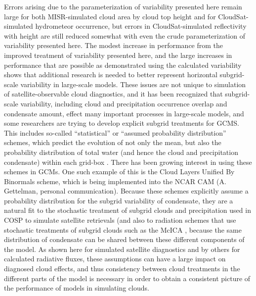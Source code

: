 Errors arising due to the parameterization of variability presented here remain large for both MISR-simulated cloud area by cloud top height and for CloudSat-simulated hydrometeor occurrence, but errors in CloudSat-simulated reflectivity with height are still reduced somewhat with even the crude parameterization of variability presented here. The modest increase in performance from the improved treatment of variability presented here, and the large increases in performance that are possible as demonstrated using the calculated variability shows that additional research is needed to better represent horizontal subgrid-scale variability in large-scale models. These issues are not unique to simulation of satellite-observable cloud diagnostics, and it has been recognized that subgrid-scale variability, including cloud and precipitation occurrence overlap and condensate amount, effect many important processes in large-scale models, and some researchers are trying to develop explicit subgrid treatments for GCMS. This includes so-called ``statistical'' or ``assumed probability distribution'' schemes, which predict the evolution of not only the mean, but also the probability distribution of total water (and hence the cloud and precipitation condensate) within each grid-box \citep[e.g.,][]{tompkins_2002}. There has been growing interest in using these schemes in GCMs. One such example of this is the Cloud Layers Unified By Binormals \citep[CLUBB;][]{golaz_et_al_2002} scheme, which is being implemented into the NCAR CAM (A. Gettelman, personal communication). Because these schemes explicitly assume a probability distribution for the subgrid variability of condensate, they are a natural fit to the stochastic treatment of subgrid clouds and precipitation used in COSP to simulate satellite retrievals (and also to radiation schemes that use stochastic treatments of subgrid clouds such as the McICA \citep{pincus_et_al_2003}, because the same distribution of condensate can be shared between these different components of the model. As shown here for simulated satellite diagnostics and by others for calculated radiative fluxes, these assumptions can have a large impact on diagnosed cloud effects, and thus consistency between cloud treatments in the different parts of the model is necessary in order to obtain a consistent picture of the performance of models in simulating clouds. 

